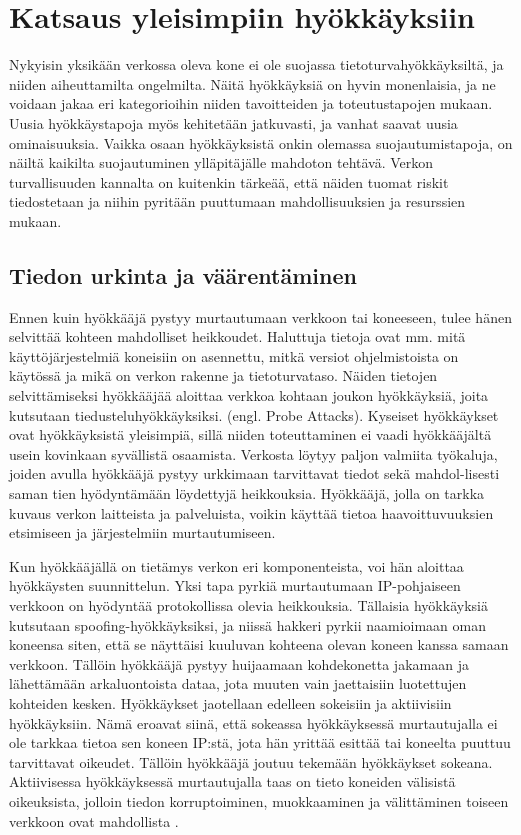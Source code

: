
\chapter{Katsaus yleisimpiin hyökkäyksiin}
Nykyisin yksikään verkossa oleva kone ei ole suojassa tietoturvahyökkäyksiltä,
ja niiden aiheuttamilta ongelmilta. Näitä hyökkäyksiä on hyvin monenlaisia, ja
ne voidaan jakaa eri kategorioihin niiden tavoitteiden ja toteutustapojen
mukaan. Uusia hyökkäystapoja myös kehitetään jatkuvasti, ja vanhat saavat uusia
ominaisuuksia. Vaikka osaan hyökkäyksistä onkin olemassa suojautumistapoja, on
näiltä kaikilta suojautuminen ylläpitäjälle mahdoton tehtävä. Verkon
turvallisuuden kannalta on kuitenkin tärkeää, että näiden tuomat riskit
tiedostetaan ja niihin pyritään puuttumaan mahdollisuuksien ja resurssien
mukaan.

\section{Tiedon urkinta ja väärentäminen}

Ennen kuin hyökkääjä pystyy murtautumaan verkkoon tai koneeseen, tulee hänen
selvittää kohteen mahdolliset heikkoudet. Haluttuja tietoja ovat mm. mitä
käyttöjärjestelmiä koneisiin on asennettu, mitkä versiot ohjelmistoista on
käytössä ja mikä on verkon rakenne ja tietoturvataso. Näiden tietojen
selvittämiseksi hyökkääjää aloittaa verkkoa kohtaan joukon hyökkäyksiä, joita
kutsutaan tiedusteluhyökkäyksiksi. (engl. Probe Attacks). Kyseiset hyökkäykset
ovat hyökkäyksistä yleisimpiä, sillä niiden toteuttaminen ei vaadi hyökkääjältä
usein kovinkaan syvällistä osaamista. Verkosta löytyy paljon valmiita työkaluja,
joiden avulla hyökkääjä pystyy urkkimaan tarvittavat tiedot sekä mahdol-lisesti
saman tien hyödyntämään löydettyjä heikkouksia. Hyökkääjä, jolla on tarkka
kuvaus verkon laitteista ja palveluista, voikin käyttää tietoa
haavoittuvuuksien etsimiseen ja järjestelmiin
mur\-tau\-tu\-mi\-seen\cite{intru}.

Kun hyökkääjällä on tietämys verkon eri komponenteista, voi hän aloittaa
hyökkäysten suunnittelun. Yksi tapa pyrkiä murtautumaan IP-pohjaiseen verkkoon
on hyödyntää protokollissa olevia heikkouksia. Tällaisia hyökkäyksiä kutsutaan
spoofing-hyökkäyksiksi, ja niissä hakkeri pyrkii naamioimaan oman koneensa
siten, että se näyttäisi kuuluvan kohteena olevan koneen kanssa samaan verkkoon.
Tällöin hyökkääjä pystyy huijaamaan kohdekonetta jakamaan ja lähettämään
arkaluontoista dataa, jota muuten vain jaettaisiin luotettujen kohteiden kesken.
Hyökkäykset jaotellaan edelleen sokeisiin ja aktiivisiin hyökkäyksiin. Nämä
eroavat siinä, että sokeassa hyökkäyksessä murtautujalla ei ole tarkkaa tietoa
sen koneen IP:stä, jota hän yrittää esittää tai koneelta puuttuu tarvittavat
oikeudet. Tällöin hyökkääjä joutuu tekemään hyökkäykset sokeana. Aktiivisessa
hyökkäyksessä murtautujalla taas on tieto koneiden välisistä oikeuksista,
jolloin tiedon korruptoiminen, muokkaaminen ja välittäminen toiseen verkkoon
ovat mahdollista \cite{websecurity}.

